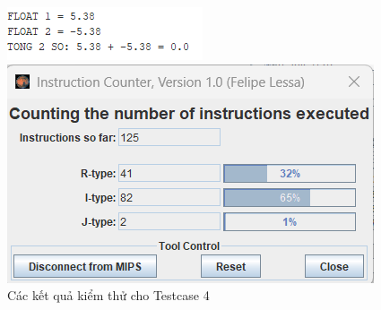 \begin{figure}[!h]
    \centering
    \begin{minipage}[b]{0.48\textwidth}
        \centering
        \includegraphics[width=\textwidth]{image/TESTCASE/Testcase 4.png}
    \end{minipage}
    \hfill
    \begin{minipage}[b]{0.48\textwidth}
        \centering
        \includegraphics[width=\textwidth]{image/TESTCASE/Instruction Counter 4.png}
    \end{minipage}
    \vspace{0.5cm}
    \caption{Các kết quả kiểm thử cho Testcase 4}
\end{figure}

\vspace{0.5 cm}


